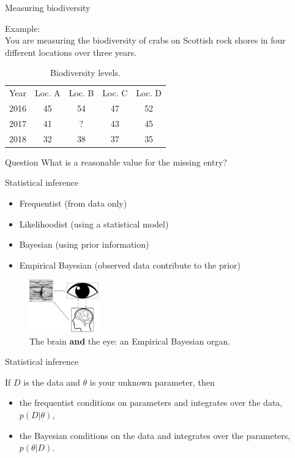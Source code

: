 \begin{frame}{Measuring biodiversity}

	Example:\\
	You are measuring the biodiversity of crabs on Scottish rock shores in four different 
	locations over three years.

	\begin{table}
		\centering
		\caption{Biodiversity levels.}
		\begin{tabular}{c|cccc}
			Year & Loc. A & Loc. B & Loc. C & Loc. D\\
			2016 & 45 & 54 & 47 & 52\\
			2017 & 41 & ? & 43 & 45\\
			2018 & 32 & 38 & 37 & 35\\
		\end{tabular}
	\end{table}

	\begin{block}{Question}
		What is a reasonable value for the missing entry?
	\end{block}

\end{frame}

\begin{frame}{Statistical inference}

	\begin{itemize}
		\item Frequentist (from data only)
		\item Likelihoodist (using a statistical model)
		\item Bayesian (using prior information)
		\item Empirical Bayesian (observed data contribute to the prior)
	\end{itemize}

	\begin{figure}[!ht]
		\centering
		\includegraphics[width=3cm]{Images/EyeBrainEB.png}
		\caption{The brain \textbf{and} the eye: an Empirical Bayesian organ.}
		\label{Fig:EyeBrainEB}
	\end{figure}

\end{frame}

\begin{frame}{Statistical inference}

	If $D$ is the data and $\theta$ is your unknown parameter, then
	\begin{itemize}
		\item the frequentist conditions on parameters and integrates over the data, $p(D|\theta)$,
		\item the Bayesian conditions on the data and integrates over the parameters, $p(\theta|D)$.
	\end{itemize}

\end{frame}

